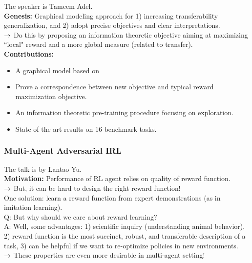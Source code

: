 The speaker is Tameem Adel. \\

{\bf Genesis:} Graphical modeling approach for 1) increasing transferability generalization, and 2) adopt precise objectives and clear interpretations. \\

$\rightarrow$ Do this by proposing an information theoretic objective aiming at maximizing ``local" reward and a more global measure (related to transfer). \\

{\bf Contributions:}
\begin{itemize}
    \item A graphical model based on
    \item Prove a correspondence between new objective and typical reward maximization objective.
    \item An information theoretic pre-training procedure focusing on exploration.
    \item State of the art results on 16 benchmark tasks.
\end{itemize}

\spacerule

\subsubsection{Multi-Agent Adversarial IRL~\cite{yu2019multi}}

The talk is by Lantao Yu. \\

{\bf Motivation:} Performance of RL agent relies on quality of reward function. \\

$\rightarrow$ But, it can be hard to design the right reward function! \\

One solution: learn a reward function from expert demonstrations (as in imitation learning). \\

Q: But why should we care about reward learning? \\

A: Well, some advantages: 1) scientific inquiry (understanding animal behavior), 2) reward function is the most succinct, robust, and transferable description of a task, 3) can be helpful if we want to re-optimize policies in new environments.  \\

$\rightarrow$ These properties are even more desirable in multi-agent setting! \\

